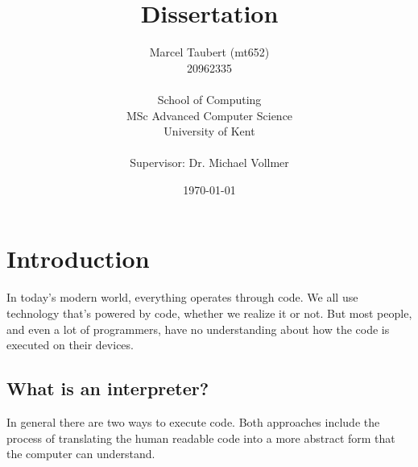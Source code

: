 \documentclass{article}
\title{Dissertation}
\author{
    Marcel Taubert  (mt652)\\
    20962335        \\
    \\
    School of Computing \\
    MSc Advanced Computer Science\\
    University of Kent \\
    \\
    Supervisor: Dr. Michael Vollmer
}
\date{\today}
\begin{document}
\maketitle
\clearpage
\section{Introduction}



In today's modern world, everything operates through code. We all use
technology that's powered by code, whether we realize it or not. But most
people, and even a lot of programmers, have no understanding about how the code
is executed on their devices.

\subsection{What is an interpreter?}
In general there are two ways to execute code. Both approaches include the
process of translating the human readable code into a more abstract form that
the computer can understand. 
\end{document}
